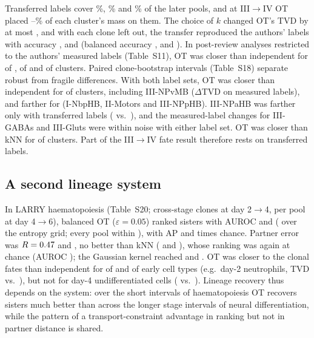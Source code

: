 \documentclass[10pt,journal,compsoc]{IEEEtran}
\begin{document}
Transferred labels cover \fateTransferredPctOne\%, \fateTransferredPctTwo\% and
\fateTransferredPctThree\% of the later pools, and at III$\to$IV OT placed
\fateOTMassTransThreeMinPct--\fateOTMassTransThreeMaxPct\% of each cluster's mass on them.
The choice of $k$ changed OT's TVD by at most \fateKRangeMaxOT, and with each clone left
out, the transfer reproduced the authors' labels with accuracy \ltAccOne, \ltAccTwo{} and
\ltAccThree{} (balanced accuracy \ltBaccOne, \ltBaccTwo{} and \ltBaccThree). In
post-review analyses restricted to the authors' measured labels (Table~S11), OT was closer
than independent for \fateMeasNBetterOne{} of \fateMeasNClustersOne{},
\fateMeasNBetterTwo{} of \fateMeasNClustersTwo{} and \fateMeasNBetterThree{} of
\fateMeasNClustersThree{} clusters. Paired clone-bootstrap intervals (Table~S18) separate
robust from fragile differences. With both label sets, OT was closer than independent for
\fpBothBetter{} of \fpNClusters{} clusters, including III-NPvMB ($\Delta$TVD
\fpMeasNPvMB{} on measured labels), and farther for \fpBothWorse{} (I-NbpHB, II-Motors and
III-NPpHB). III-NPaHB was farther only with transferred labels (\fpTransNPaHB{} vs.\
\fpMeasNPaHB), and the measured-label changes for III-GABAs and III-Gluts were within
noise with either label set. OT was closer than kNN for \fpKnnBetter{} of \fpKnnN{}
clusters. Part of the III$\to$IV fate result therefore rests on transferred labels.

\subsection{A second lineage system}\label{sec:larry}
In LARRY haematopoiesis (Table~S20; \larryNClonesA{} cross-stage clones at day 2$\to$4,
\larryNClonesB{} per pool at day 4$\to$6), balanced OT ($\varepsilon=0.05$) ranked sisters
with AUROC \larryAUROCA{} and \larryAUROCB{} (\larryOTEpsAUROC{} over the entropy grid; every
pool within \larryPoolMaxDev), with AP \larryAPRA{} and \larryAPRB{} times chance. Partner
error was $R=0.47$ and \larryRB, no better than kNN (\larryKnnRA{} and
\larryKnnRB), whose ranking was again at chance (AUROC \larryKnnAUROC); the Gaussian kernel
reached \larryGaussAUROCA{} and \larryGaussAUROCB. OT was closer to the clonal fates than
independent for \larryFateNBetterA{} of \larryFateNA{} and \larryFateNBetterB{} of
\larryFateNB{} early cell types (e.g.\ day-2 neutrophils, TVD \larryTvdOTNeu{} vs.\
\larryTvdIndNeu), but not for day-4 undifferentiated cells (\larryTvdOTUnd{} vs.\
\larryTvdIndUnd). Lineage recovery thus depends on the system: over the short intervals of
haematopoiesis OT recovers sisters much better than across the longer stage intervals of
neural differentiation, while the pattern of a transport-constraint advantage in ranking but not in
partner distance is shared.
\end{document}
